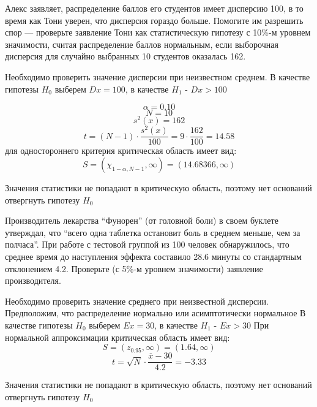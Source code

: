 \begin{problem}
	 Алекс заявляет, распределение баллов его студентов имеет дисперсию 100,
	 в то время как Тони уверен, что дисперсия гораздо больше. Помогите им разрешить
	 спор — проверьте заявление Тони как статистическую гипотезу с 10\%-м уровнем значимости, считая распределение баллов нормальным, если выборочная дисперсия для
	 случайно выбранных 10 студентов оказалась 162.
\end{problem}
Необходимо проверить значение дисперсии при неизвестном среднем.
В качестве гипотезы $H_0$ выберем $Dx = 100$, в качестве $H_1$ - $Dx > 100$ 

\[ \alpha = 0.10 \]
\[ N = 10 \]
\[ s^2(x) = 162 \]
\[ t = (N-1)\cdot \dfrac{s^2(x)}{100} = 9 \cdot \dfrac{162}{100} = 14.58\]
для одностороннего критерия критическая область имеет вид:
\[ S = (\chi_{1-\alpha,N-1},\infty) = (14.68366,\infty)\]

 Значения статистики не попадают в критическую область, поэтому нет оснований отвергнуть гипотезу $H_0$
 
 \begin{problem}
	 Производитель лекарства “Фунорен” (от головной боли) в своем буклете
	 утверждал, что “всего одна таблетка остановит боль в среднем меньше, чем за полчаса”. При работе с тестовой группой из 100 человек обнаружилось, что среднее время
	 до наступления эффекта составило 28.6 минуты со стандартным отклонением 4.2. Проверьте (с 5\%-м уровнем значимости) заявление производителя.
 \end{problem}
 Необходимо проверить значение среднего при неизвестной дисперсии. Предположим, что распределение нормально или асимптотически нормальное
 В качестве гипотезы $H_0$ выберем $Ex = 30$, в качестве $H_1$ - $Ex > 30$ 
 При нормальной аппроксимации критическая область имеет вид:
 \[ S = (z_{0.95},\infty) = (1.64, \infty)\]
 \[ t = \sqrt{N}\cdot \dfrac{\overline{x} - 30}{4.2} = -3.33\]
 
 Значения статистики не попадают в критическую область, поэтому нет оснований отвергнуть гипотезу $H_0$